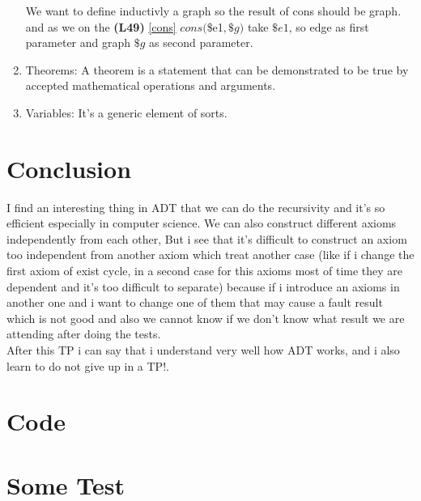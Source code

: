\documentclass[a4paper,11pt,final]{article}
\begin{document}
\begin{enumerate}[label=\color{blue}\theenumi]
\bigskip\noindent

We want to define inductivly a graph so the result of cons should be graph.\\
and as we on the \textbf{(L49)} \ref{cons} $cons($\$e1$,\$g)$ take $\$e1$, so edge as first parameter and graph $\$g$ as second parameter.

\bigskip\noindent

\bigskip\noindent

\item \textcolor{colour0}{Theorems}\label{theorems}: A theorem is a statement that can be demonstrated to be true by accepted mathematical operations and arguments.

\item \textcolor{colour0}{Variables}\label{variables}: It's a generic element of sorts.
\end{enumerate}

\section{Conclusion}
I find an interesting thing in ADT that we can do the recursivity and it's so efficient especially in computer science.
We can also construct different axioms independently from each other, But i see that it's difficult to construct an axiom  too independent from another axiom which treat another case (like if i change the first axiom of exist cycle, in a second case for this axioms most of time they are dependent and it's too difficult to separate) because if i introduce an axioms in another one and i want to change one of them that may cause a fault result which is not good and also we cannot know if we don't know what result we are attending after doing the tests.\\
After this TP i can say that i understand very well how ADT works, and i also learn to do not give up in a TP!.
\newpage
\appendix
\section{Code} \label{App:code}

\section{Some Test} \label{App:test}



\end{document}
